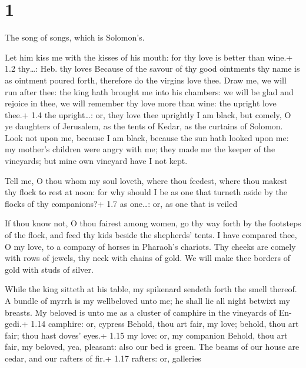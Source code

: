 \hypertarget{section}{%
\section{1}\label{section}}

 The song of songs, which is Solomon's.

 Let him kiss me with the kisses of his mouth: for thy love
is better than wine.+ 1.2 thy\ldots: Heb. thy loves  Because
of the savour of thy good ointments thy name is as ointment poured
forth, therefore do the virgins love thee.  Draw me, we will
run after thee: the king hath brought me into his chambers: we will be
glad and rejoice in thee, we will remember thy love more than wine: the
upright love thee.+ 1.4 the upright\ldots: or, they love thee uprightly
 I am black, but comely, O ye daughters of Jerusalem, as the
tents of Kedar, as the curtains of Solomon.  Look not upon
me, because I am black, because the sun hath looked upon me: my mother's
children were angry with me; they made me the keeper of the vineyards;
but mine own vineyard have I not kept.

 Tell me, O thou whom my soul loveth, where thou feedest,
where thou makest thy flock to rest at noon: for why should I be as one
that turneth aside by the flocks of thy companions?+ 1.7 as one\ldots:
or, as one that is veiled

 If thou know not, O thou fairest among women, go thy way
forth by the footsteps of the flock, and feed thy kids beside the
shepherds' tents.  I have compared thee, O my love, to a
company of horses in Pharaoh's chariots.  Thy cheeks are
comely with rows of jewels, thy neck with chains of gold. 
We will make thee borders of gold with studs of silver.

 While the king sitteth at his table, my spikenard
sendeth forth the smell thereof.  A bundle of myrrh is my
wellbeloved unto me; he shall lie all night betwixt my breasts.
 My beloved is unto me as a cluster of camphire in the
vineyards of En-gedi.+ 1.14 camphire: or, cypress  Behold,
thou art fair, my love; behold, thou art fair; thou hast doves' eyes.+
1.15 my love: or, my companion  Behold, thou art fair, my
beloved, yea, pleasant: also our bed is green.  The beams
of our house are cedar, and our rafters of fir.+ 1.17 rafters: or,
galleries

